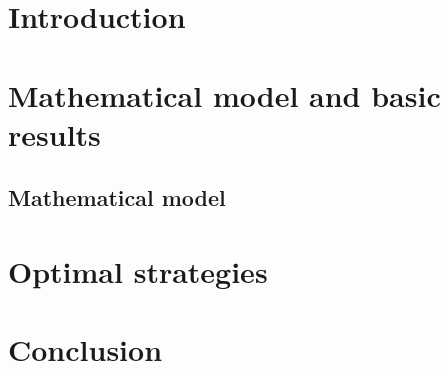 \documentclass[13pt, a4paper, oneside]{book}
\makeatletter
\def\cleardoublepage{\clearpage\if@twoside \ifodd\c@page\else
    \hbox{}
    \thispagestyle{plain}
    \newpage
    \if@twocolumn\hbox{}\newpage\fi\fi\fi}
\numberwithin{subsection}{section}
\makeatother
\begin{document}
\listoffigures
\listoftables
  
\clearpage
\cleardoublepage

\chapter*{Introduction}

\chapter{Mathematical model and basic results}
\section{Mathematical model}


\chapter{Optimal strategies}

\chapter{Conclusion}

\printbibliography
\end{document}
